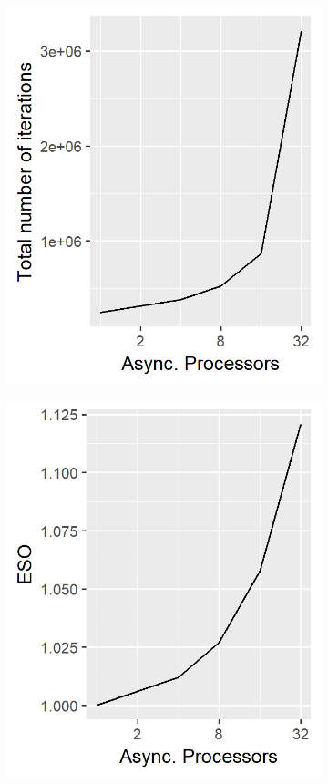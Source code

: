 \begin{figure}
\begin{subfigure}{0.30\linewidth}
		\includegraphics[width=1.0\linewidth]{./chapters/05.pcdm/scalability/speedup_pcdm_iter.png}
	\end{subfigure}
	\begin{subfigure}{0.30\linewidth}
		\includegraphics[width=1.0\linewidth]{./chapters/05.pcdm/scalability/speedup_pcdm_eso.png}

\end{subfigure}
\end{figure}
